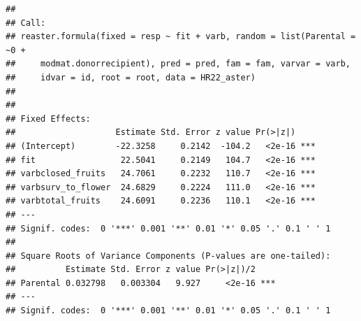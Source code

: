 \documentclass[
]{article}
\begin{document}
\begin{verbatim}
## 
## Call:
## reaster.formula(fixed = resp ~ fit + varb, random = list(Parental = ~0 + 
##     modmat.donorrecipient), pred = pred, fam = fam, varvar = varb, 
##     idvar = id, root = root, data = HR22_aster)
## 
## 
## Fixed Effects:
##                    Estimate Std. Error z value Pr(>|z|)    
## (Intercept)        -22.3258     0.2142  -104.2   <2e-16 ***
## fit                 22.5041     0.2149   104.7   <2e-16 ***
## varbclosed_fruits   24.7061     0.2232   110.7   <2e-16 ***
## varbsurv_to_flower  24.6829     0.2224   111.0   <2e-16 ***
## varbtotal_fruits    24.6091     0.2236   110.1   <2e-16 ***
## ---
## Signif. codes:  0 '***' 0.001 '**' 0.01 '*' 0.05 '.' 0.1 ' ' 1
## 
## Square Roots of Variance Components (P-values are one-tailed):
##          Estimate Std. Error z value Pr(>|z|)/2    
## Parental 0.032798   0.003304   9.927     <2e-16 ***
## ---
## Signif. codes:  0 '***' 0.001 '**' 0.01 '*' 0.05 '.' 0.1 ' ' 1
\end{verbatim}
\end{document}
